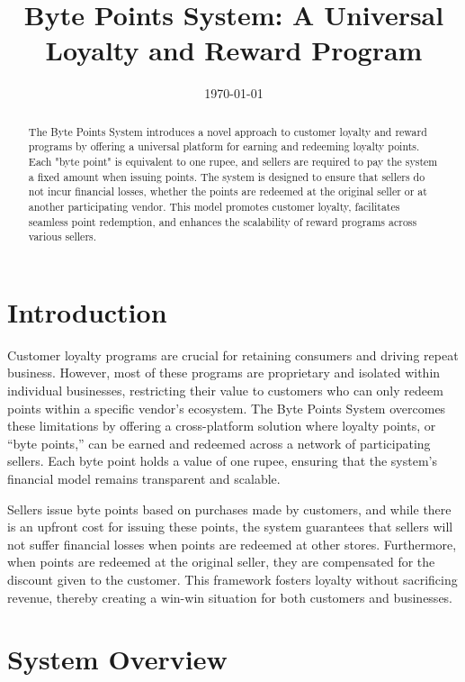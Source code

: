 \documentclass[a4paper,12pt]{article}
\title{Byte Points System: A Universal Loyalty and Reward Program}
\author{}
\date{\today}
\begin{document}
\maketitle

\begin{abstract}
The Byte Points System introduces a novel approach to customer loyalty and reward programs by offering a universal platform for earning and redeeming loyalty points. Each "byte point" is equivalent to one rupee, and sellers are required to pay the system a fixed amount when issuing points. The system is designed to ensure that sellers do not incur financial losses, whether the points are redeemed at the original seller or at another participating vendor. This model promotes customer loyalty, facilitates seamless point redemption, and enhances the scalability of reward programs across various sellers.
\end{abstract}

\section{Introduction}

Customer loyalty programs are crucial for retaining consumers and driving repeat business. However, most of these programs are proprietary and isolated within individual businesses, restricting their value to customers who can only redeem points within a specific vendor’s ecosystem. The Byte Points System overcomes these limitations by offering a cross-platform solution where loyalty points, or “byte points,” can be earned and redeemed across a network of participating sellers. Each byte point holds a value of one rupee, ensuring that the system’s financial model remains transparent and scalable.

Sellers issue byte points based on purchases made by customers, and while there is an upfront cost for issuing these points, the system guarantees that sellers will not suffer financial losses when points are redeemed at other stores. Furthermore, when points are redeemed at the original seller, they are compensated for the discount given to the customer. This framework fosters loyalty without sacrificing revenue, thereby creating a win-win situation for both customers and businesses.

\section{System Overview}
\end{document}
